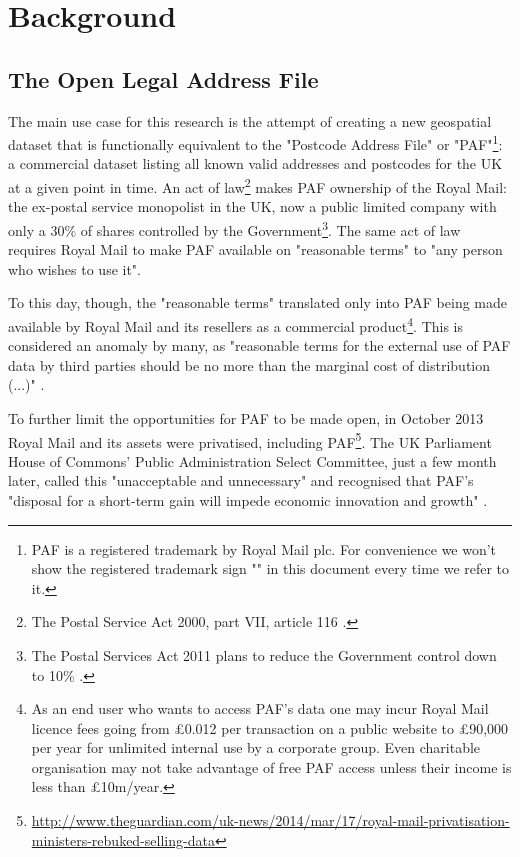 \section{Background}

\subsection{The Open Legal Address File}

    The main use case for this research is the attempt of creating a new geospatial dataset that is functionally equivalent to the "Postcode Address File" or "PAF"\footnote{PAF is a registered trademark by Royal Mail plc. For convenience we won't show the registered trademark sign "\textregistered" in this document every time we refer to it.}: a commercial dataset listing all known valid addresses and postcodes for the UK at a given point in time. 
    An act of law\footnote{The Postal Service Act 2000, part VII, article 116 \cite{postalserviceact2000}.} makes PAF ownership of the Royal Mail: the ex-postal service monopolist in the UK, now a public limited company with only a 30\% of shares controlled by the Government\footnote{The Postal Services Act 2011 plans to reduce the Government control down to 10\% \cite{postalserviceact2011}.}. The same act of law requires Royal Mail to make PAF available on "reasonable terms" to "any person who wishes to use it".
    
    To this day, though, the "reasonable terms" translated only into PAF being made available by Royal Mail and its resellers as a commercial product\footnote{As an end user who wants to access PAF's data one may incur Royal Mail licence fees going from \pounds0.012 per transaction on a public website to \pounds90,000 per year for unlimited internal use by a corporate group. Even charitable organisation may not take advantage of free PAF access unless their income is less than \pounds10m/year.}. This is considered an anomaly by many, as "reasonable terms for the external use of PAF data by third parties should be no more than the marginal cost of distribution (...)" \cite{odugresponse}. 

    To further limit the opportunities for PAF to be made open, in October 2013 Royal Mail and its assets were privatised, including PAF\footnote{\url{http://www.theguardian.com/uk-news/2014/mar/17/royal-mail-privatisation-ministers-rebuked-selling-data}}. The UK Parliament House of Commons' Public Administration Select Committee, just a few month later, called this "unacceptable and unnecessary" and recognised that PAF's "disposal for a short-term gain will impede economic innovation and growth" \cite{pascod}.


